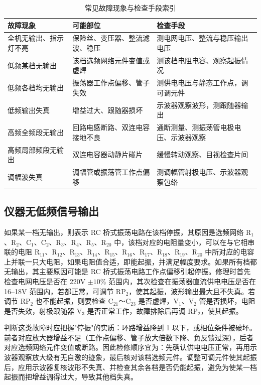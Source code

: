 \documentclass[12pt,UTF8]{ctexbook}
\begin{document}
	\begin{table}[H]
		\centering
		\caption{常见故障现象与检查手段索引}
		\begin{tabular}{|p{3.2cm}|p{4.4cm}|p{4.8cm}|}
			\hline
			\textbf{故障现象} & \textbf{可能部位} & \textbf{检查手段} \\ \hline
			全机无输出、指示灯不亮 & 保险丝、变压器、整流滤波、稳压 & 测电网电压、整流与稳压输出电压 \\ \hline
			低频某档无输出 & 该档选频网络元件变值或虚焊 & 测该档电阻电容、观察起振情况 \\ \hline
			低频各档均无输出 & 振荡器工作点偏移、管子失效 & 测供电电压与静态工作点，调可调元件 \\ \hline
			低频输出失真 & 增益过大、跟随器损坏 & 示波器观察波形，测跟随器输出 \\ \hline
			高频全频段无输出 & 回路电感断路、双连电容接地不良 & 通断测量、测振荡管电极电压、示波器观察 \\ \hline
			高频局部频段无输出 & 双连电容器动静片碰片 & 缓慢转动观察、目视检查片间 \\ \hline
			调幅波失真 & 调幅管或振荡管工作点偏移 & 测调幅管射极电压、示波器观察包络 \\ \hline
		\end{tabular}
	\end{table}
	\subsection{仪器无低频信号输出}
	如果某一档无输出，则表示 RC 桥式振荡电路在该档停振，其原因是选频网络 R\(_1\)、R\(_2\)、C\(_1\)、C\(_2\)、R\(_3\)、R\(_4\)、R\(_5\)、R\(_{20}\) 中，该档对应的电阻量变小，可以在与它相串联的电阻 R\(_{11}\)、R\(_{12}\)、R\(_{13}\)、R\(_{14}\)、R\(_{15}\)、R\(_{16}\)、R\(_{17}\)、R\(_{18}\)、R\(_{19}\)、R\(_{20}\) 中所对应的电容上并联一只大电阻，如果电阻值合适，即能起振，并满足幅度要求。如果所有档都无输出，其主要原因可能是 RC 桥式振荡电路工作点偏移引起停振。修理时首先检查电网电压是否在 220V \(\pm 10\%\) 范围内，其次检查在振荡器直流供电电压是否在 16--18V 范围内，若都正常，可调节 RP\(_2\)，使其起振，波形输出最大且不失真。若调节 RP\(_2\) 也不能起振，则要检查 C\(_{21}\)～C\(_{23}\) 是否虚焊，V\(_1\)、V\(_2\) 管是否损坏，电阻是否失效，射极跟随器 V\(_3\) 是否正常工作，故障排除后再调 RP\(_2\)，使其起振。
	
	判断这类故障时应把握"停振"的实质：环路增益降到 1 以下，或相位条件被破坏。前者对应放大器增益不足（工作点偏移、管子放大倍数下降、负反馈过深），后者对应选频网络元件变值或断路。因此检修顺序宜为：先确认供电电压正常，再用示波器观察放大级有无自激的迹象，最后核对该档选频元件。调整可调元件使其起振后，应用示波器复核波形不失真、并检查其余各档是否仍能起振，避免为使某一档起振而把增益调得过大，导致其他档失真。
	
\end{document}
